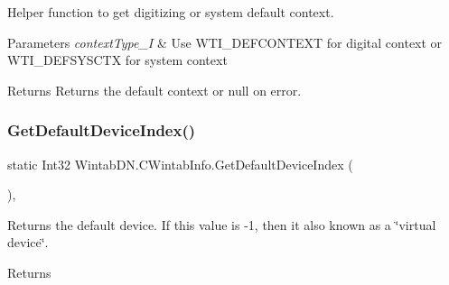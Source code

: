 Helper function to get digitizing or system default context. 


\begin{DoxyParams}{Parameters}
{\em context\+Type\+\_\+I} & Use W\+T\+I\+\_\+\+D\+E\+F\+C\+O\+N\+T\+E\+XT for digital context or W\+T\+I\+\_\+\+D\+E\+F\+S\+Y\+S\+C\+TX for system context\\
\hline
\end{DoxyParams}
\begin{DoxyReturn}{Returns}
Returns the default context or null on error.
\end{DoxyReturn}
\mbox{\label{class_wintab_d_n_1_1_c_wintab_info_a2ca9dbcbb073bb443b57143868677cb4}} 
\subsubsection{\texorpdfstring{Get\+Default\+Device\+Index()}{GetDefaultDeviceIndex()}}
{\footnotesize\ttfamily static Int32 Wintab\+D\+N.\+C\+Wintab\+Info.\+Get\+Default\+Device\+Index (\begin{DoxyParamCaption}{ }\end{DoxyParamCaption})\hspace{0.3cm}{\ttfamily [inline]}, {\ttfamily [static]}}



Returns the default device. If this value is -\/1, then it also known as a \char`\"{}virtual device\char`\"{}. 

\begin{DoxyReturn}{Returns}

\end{DoxyReturn}
\mbox{\label{class_wintab_d_n_1_1_c_wintab_info_a7bceb028e21a4c94d44ba0e3b8a75fa4}} 
